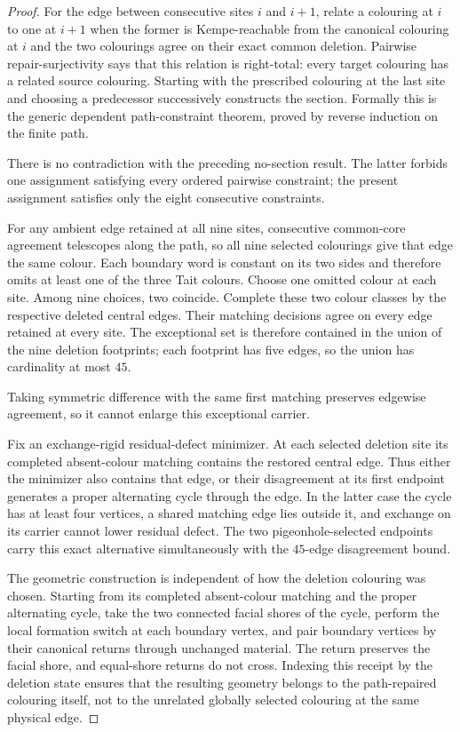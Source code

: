 \begin{proof}
For the edge between consecutive sites $i$ and $i+1$, relate a colouring at
$i$ to one at $i+1$ when the former is Kempe-reachable from the canonical
colouring at $i$ and the two colourings agree on their exact common deletion.
Pairwise repair-surjectivity says that this relation is right-total: every
target colouring has a related source colouring.  Starting with the prescribed
colouring at the last site and choosing a predecessor successively constructs
the section.  Formally this is the generic dependent path-constraint theorem,
proved by reverse induction on the finite path.

There is no contradiction with the preceding no-section result.  The latter
forbids one assignment satisfying every ordered pairwise constraint; the
present assignment satisfies only the eight consecutive constraints.

For any ambient edge retained at all nine sites, consecutive common-core
agreement telescopes along the path, so all nine selected colourings give that
edge the same colour.  Each boundary word is constant on its two sides and
therefore omits at least one of the three Tait colours.  Choose one omitted
colour at each site.  Among nine choices, two coincide.  Complete these two
colour classes by the respective deleted central edges.  Their matching
decisions agree on every edge retained at every site.  The exceptional set is
therefore contained in the union of the nine deletion footprints; each
footprint has five edges, so the union has cardinality at most $45$.

Taking symmetric difference with the same first matching preserves edgewise
agreement, so it cannot enlarge this exceptional carrier.

Fix an exchange-rigid residual-defect minimizer.  At each selected deletion
site its completed absent-colour matching contains the restored central edge.
Thus either the minimizer also contains that edge, or their disagreement at
its first endpoint generates a proper alternating cycle through the edge.
In the latter case the cycle has at least four vertices, a shared matching
edge lies outside it, and exchange on its carrier cannot lower residual
defect.  The two pigeonhole-selected endpoints carry this exact alternative
simultaneously with the $45$-edge disagreement bound.

The geometric construction is independent of how the deletion colouring was
chosen.  Starting from its completed absent-colour matching and the proper
alternating cycle, take the two connected facial shores of the cycle, perform
the local formation switch at each boundary vertex, and pair boundary vertices
by their canonical returns through unchanged material.  The return preserves
the facial shore, and equal-shore returns do not cross.  Indexing this receipt
by the deletion state ensures that the resulting geometry belongs to the
path-repaired colouring itself, not to the unrelated globally selected
colouring at the same physical edge.


\end{proof}
